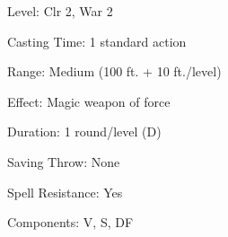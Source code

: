 
\begin{description*}
\item[Level:] Clr 2, War 2
\item[Casting Time:] 1 standard action
\item[Range:] Medium (100 ft. + 10 ft./level)
\item[Effect:] Magic weapon of force
\item[Duration:] 1 round/level (D)
\item[Saving Throw:] None
\item[Spell Resistance:] Yes
\item[Components:] V, S, DF
\end{description*}

